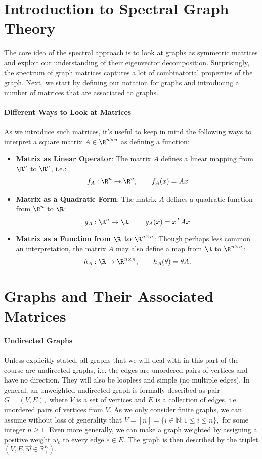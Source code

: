    

\section{Introduction to Spectral Graph Theory}

The core idea of the spectral approach is to look at graphs as symmetric matrices and exploit our understanding of their eigenvector decomposition. Surprisingly, the spectrum of graph matrices captures a lot of combinatorial properties of the graph. Next, we start by defining our notation for graphs and introducing a number of matrices that are associated to graphs.

\paragraph{Different Ways to Look at Matrices} As we introduce such matrices, it's useful to keep in mind the following ways to interpret a square matrix $A \in \R^{n \times n}$ as defining a function:
\begin{itemize}
\item {\bf Matrix as Linear Operator}: The matrix $A$ defines a linear mapping from $\R^n$ to $\R^n$, i.e.:
\begin{align*}
f_A: \R^n \to \R^n, \qquad f_A(x) = Ax
\end{align*}
\item {\bf Matrix as a Quadratic Form}: The matrix $A$ defines a quadratic function from $\R^n$ to $\R$:
$$
g_A: \R^n \to \R, \qquad g_A(x) = x^TAx
$$
\item {\bf Matrix as a Function from $\R$ to $\R^{n \times n}$}: Though perhaps less common an interpretation, the matrix $A$ may also define a map from $\R$ to $\R^{n \times n}$:
$$
	h_A: \R \to \R^{n \times n}, \qquad h_A(\theta) = \theta A.
$$
\end{itemize}

\section{Graphs and Their Associated Matrices}

\paragraph{Undirected Graphs}
Unless explicitly stated, all graphs that we will deal with in this part of the course are undirected graphs, i.e. the edges are unordered pairs of vertices and have no direction. They will also be loopless and simple (no multiple edges).
%
In general, an unweighted undirected graph is formally described as pair  $G= (V, E),$ where $V$ is a set of vertices and $E$ is a collection of edges, i.e. unordered pairs of vertices from $V.$ As we only consider finite graphs, we can assume without loss of generality that $V = [n] = \{i \in \mathbb{N}: 1 \leq i \leq n\},$ for some integer $n \geq 1.$
%
Even more generally, we can make a graph weighted by assigning a positive weight $w_e$ to every edge $e \in E.$ The graph is then described by the triplet $(V, E, \vec{w} \in \mathbb{R}_+^E).$


